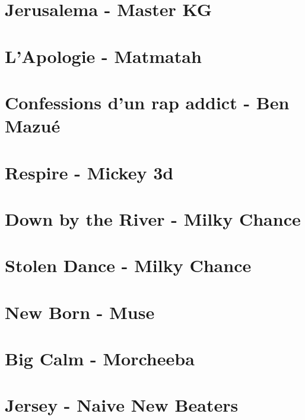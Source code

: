 \documentclass[11pt]{article}
\begin{document}
\section{Jerusalema - Master KG}


\section{L'Apologie - Matmatah}


\section{Confessions d'un rap addict - Ben Mazué}
\begin{guitar}

\end{guitar}

\section{Respire - Mickey 3d}




\section{Down by the River - Milky Chance}


\section{Stolen Dance - Milky Chance}
\begin{guitar}

\end{guitar}





\section{New Born - Muse}




\section{Big Calm - Morcheeba}


\section{Jersey - Naive New Beaters}
\begin{guitar}

\end{guitar}
\end{document}
